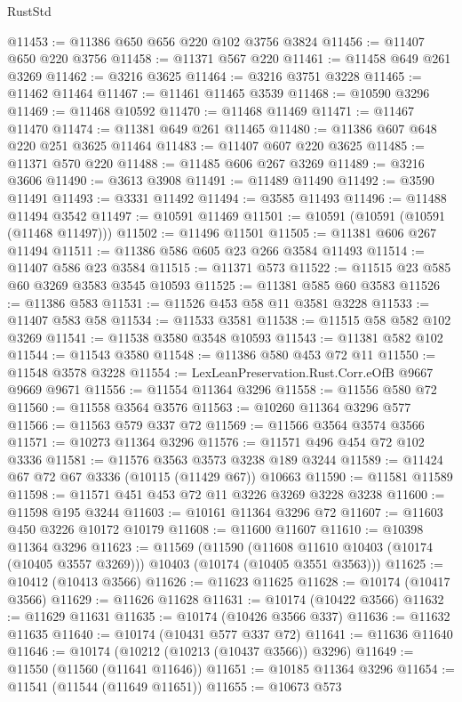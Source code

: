\begin{lexlean}{RustStd}
\begin{coremodule}
@11453 := @11386 @650 @656 @220 @102 @3756 @3824
@11456 := @11407 @650 @220 @3756
@11458 := @11371 @567 @220
@11461 := @11458 @649 @261 @3269
@11462 := @3216 @3625
@11464 := @3216 @3751 @3228
@11465 := @11462 @11464
@11467 := @11461 @11465 @3539
@11468 := @10590 @3296
@11469 := @11468 @10592
@11470 := @11468 @11469
@11471 := @11467 @11470
@11474 := @11381 @649 @261 @11465
@11480 := @11386 @607 @648 @220 @251 @3625 @11464
@11483 := @11407 @607 @220 @3625
@11485 := @11371 @570 @220
@11488 := @11485 @606 @267 @3269
@11489 := @3216 @3606
@11490 := @3613 @3908
@11491 := @11489 @11490
@11492 := @3590 @11491
@11493 := @3331 @11492
@11494 := @3585 @11493
@11496 := @11488 @11494 @3542
@11497 := @10591 @11469
@11501 := @10591 (@10591 (@10591 (@11468 @11497)))
@11502 := @11496 @11501
@11505 := @11381 @606 @267 @11494
@11511 := @11386 @586 @605 @23 @266 @3584 @11493
@11514 := @11407 @586 @23 @3584
@11515 := @11371 @573
@11522 := @11515 @23 @585 @60 @3269 @3583 @3545 @10593
@11525 := @11381 @585 @60 @3583
@11526 := @11386 @583
@11531 := @11526 @453 @58 @11 @3581 @3228
@11533 := @11407 @583 @58
@11534 := @11533 @3581
@11538 := @11515 @58 @582 @102 @3269
@11541 := @11538 @3580 @3548 @10593
@11543 := @11381 @582 @102
@11544 := @11543 @3580
@11548 := @11386 @580 @453 @72 @11
@11550 := @11548 @3578 @3228
@11554 := LexLeanPreservation.Rust.Corr.eOfB @9667 @9669 @9671
@11556 := @11554 @11364 @3296
@11558 := @11556 @580 @72
@11560 := @11558 @3564 @3576
@11563 := @10260 @11364 @3296 @577
@11566 := @11563 @579 @337 @72
@11569 := @11566 @3564 @3574 @3566
@11571 := @10273 @11364 @3296
@11576 := @11571 @496 @454 @72 @102 @3336
@11581 := @11576 @3563 @3573 @3238 @189 @3244
@11589 := @11424 @67 @72 @67 @3336 (@10115 (@11429 @67)) @10663
@11590 := @11581 @11589
@11598 := @11571 @451 @453 @72 @11 @3226 @3269 @3228 @3238
@11600 := @11598 @195 @3244
@11603 := @10161 @11364 @3296 @72
@11607 := @11603 @450 @3226 @10172 @10179
@11608 := @11600 @11607
@11610 := @10398 @11364 @3296
@11623 := @11569
    (@11590
      (@11608 @11610 @10403 (@10174 (@10405 @3557 @3269)))
      @10403
      (@10174 (@10405 @3551 @3563)))
@11625 := @10412 (@10413 @3566)
@11626 := @11623 @11625
@11628 := @10174 (@10417 @3566)
@11629 := @11626 @11628
@11631 := @10174 (@10422 @3566)
@11632 := @11629 @11631
@11635 := @10174 (@10426 @3566 @337)
@11636 := @11632 @11635
@11640 := @10174 (@10431 @577 @337 @72)
@11641 := @11636 @11640
@11646 := @10174 (@10212 (@10213 (@10437 @3566)) @3296)
@11649 := @11550 (@11560 (@11641 @11646))
@11651 := @10185 @11364 @3296
@11654 := @11541 (@11544 (@11649 @11651))
@11655 := @10673 @573

\end{coremodule}
\end{lexlean}
